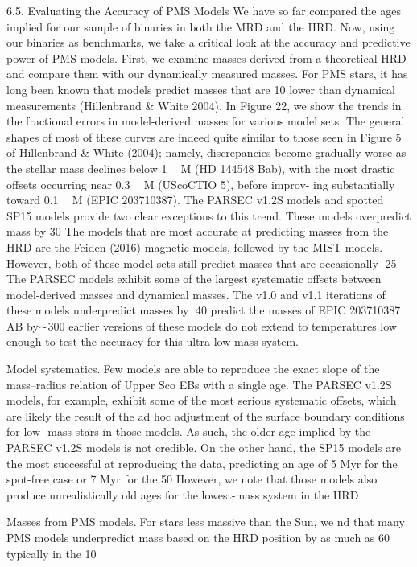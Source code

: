 \documentclass[../main.tex]{subfiles}
\begin{document}
{6.5. Evaluating the Accuracy of PMS Models
We have so far compared the ages implied for our sample of
binaries in both the MRD and the HRD. Now, using our
binaries as benchmarks, we take a critical look at the accuracy
and predictive power of PMS models. First, we examine
masses derived from a theoretical HRD and compare them with
our dynamically measured masses. For PMS stars, it has long
been known that models predict masses that are 10%
lower than dynamical measurements (Hillenbrand & White
2004). In Figure 22, we show the trends in the fractional errors
in model-derived masses for various model sets. The general
shapes of most of these curves are indeed quite similar to those
seen in Figure 5 of Hillenbrand & White (2004); namely,
discrepancies become gradually worse as the stellar mass
declines below 1  M (HD 144548 Bab), with the most drastic
offsets occurring near 0.3  M (UScoCTIO 5), before improv-
ing substantially toward 0.1  M (EPIC 203710387). The
PARSEC v1.2S models and spotted SP15 models provide
two clear exceptions to this trend. These models overpredict
mass by 30%
The models that are most accurate at predicting masses from
the HRD are the Feiden (2016) magnetic models, followed by
the MIST models. However, both of these model sets still
predict masses that are occasionally 25%
The PARSEC models exhibit some of the largest systematic
offsets between model-derived masses and dynamical masses. The v1.0 and v1.1 iterations of these models underpredict
masses by 40%
predict the masses of EPIC 203710387 AB by∼300%
earlier versions of these models do not extend to temperatures
low enough to test the accuracy for this ultra-low-mass system.

Model systematics.Few models are able to reproduce the
exact slope of the mass–radius relation of Upper Sco EBs
with a single age. The PARSEC v1.2S models, for
example, exhibit some of the most serious systematic
offsets, which are likely the result of the ad hoc
adjustment of the surface boundary conditions for low-
mass stars in those models. As such, the older age implied
by the PARSEC v1.2S models is not credible. On the
other hand, the SP15 models are the most successful at
reproducing the data, predicting an age of 5 Myr for the
spot-free case or 7 Myr for the 50%
However, we note that those models also produce
unrealistically old ages for the lowest-mass system in
the HRD

Masses from PMS models.For stars less massive than the
Sun, we nd that many PMS models underpredict mass
based on the HRD position by as much as 60%
typically in the 10%


}
\end{document}
